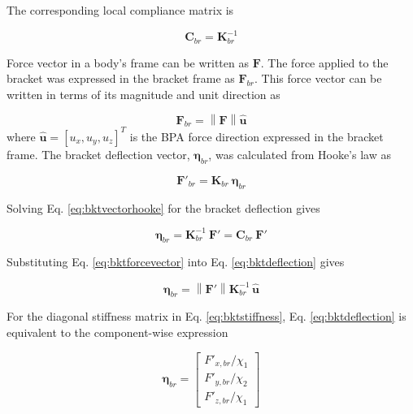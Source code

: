 The corresponding local compliance matrix is 

\begin{equation}
\mathbf{C}_{br} = \mathbf{K}_{br}^{-1}
\label{eq:bktcompliance}
\end{equation}

Force vector in a body's frame can be written as $\mathbf{F}$. The force applied to the bracket was expressed in the bracket frame as $\mathbf{F}_{br}$. This force vector can be written in terms of its magnitude and unit direction as

\begin{equation}
\mathbf{F}_{br} = \left\| \mathbf{F} \right\| \hat{\mathbf{u}}
\label{eq:bktforcevector}
\end{equation}
\noindent
where $\hat{\mathbf{u}} = [u_{x}, u_{y}, u_{z}]^{T}$ is the BPA force direction expressed in the bracket frame. The bracket deflection vector, $\boldsymbol{\eta}_{br}$, was calculated from Hooke's law as 

\begin{equation} \mathbf{F}'_{br} = \mathbf{K}_{br} \: \boldsymbol{\eta}_{br}
\label{eq:bktvectorhooke}
\end{equation}

Solving Eq. \ref{eq:bktvectorhooke} for the bracket deflection gives

\begin{equation}
\boldsymbol{\eta}_{br} = \mathbf{K}_{br}^{-1} \: \mathbf{F}' = \mathbf{C}_{br} \: \mathbf{F}'
\label{eq:bktdeflection}
\end{equation}

Substituting Eq. \ref{eq:bktforcevector} into Eq. \ref{eq:bktdeflection} gives

\begin{equation}
\boldsymbol{\eta}_{br} = \left\| \mathbf{F}' \right\| \mathbf{K}_{br}^{-1} \,\hat{\mathbf{u}}
\label{eq:bktdeflectionforceunit}
\end{equation}

For the diagonal stiffness matrix in Eq. \ref{eq:bktstiffness}, Eq. \ref{eq:bktdeflection} is equivalent to the component-wise expression

\begin{equation}
\boldsymbol{\eta}_{br} = \begin{bmatrix} F'_{x,br}/\chi_{1} \\ F'_{y,br}/\chi_{2} \\ F'_{z,br}/\chi_{1} \end{bmatrix}
\label{eq:bktcomponentdeflection}
\end{equation}

